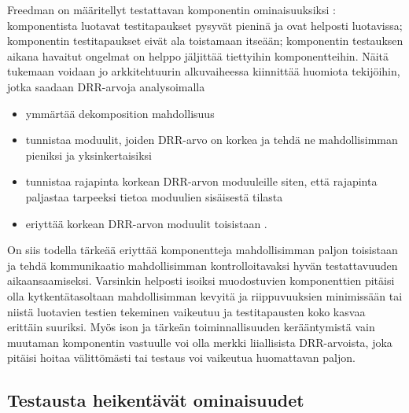 \documentclass[finnish]{tktltiki2}
\numberwithin{table}{section}
\theoremstyle{definition}
\theoremstyle{remark}
\begin{document}



Freedman on määritellyt testattavan komponentin ominaisuuksiksi \citep{Freedman:1991:TSC:126218.126229}: komponentista luotavat testitapaukset pysyvät pieninä ja ovat helposti luotavissa; komponentin testitapaukset eivät ala toistamaan itseään; komponentin testauksen aikana havaitut ongelmat on helppo jäljittää tiettyihin komponentteihin. Näitä tukemaan voidaan jo arkkitehtuurin alkuvaiheessa kiinnittää huomiota tekijöihin, jotka saadaan DRR-arvoja analysoimalla \citep{voas_improving_1992} 

\begin{itemize}
	\item ymmärtää dekomposition mahdollisuus
	\item tunnistaa moduulit, joiden DRR-arvo on korkea ja tehdä ne mahdollisimman pieniksi ja yksinkertaisiksi
	\item tunnistaa rajapinta korkean DRR-arvon moduuleille siten, että rajapinta paljastaa tarpeeksi tietoa moduulien sisäisestä tilasta
	\item eriyttää korkean DRR-arvon moduulit toisistaan \citep[s. 23]{Voas:1995:STN:624607.625469}.
\end{itemize}


On siis todella tärkeää eriyttää komponentteja mahdollisimman paljon toisistaan ja tehdä kommunikaatio mahdollisimman kontrolloitavaksi hyvän testattavuuden aikaansaamiseksi. Varsinkin helposti isoiksi muodostuvien komponenttien pitäisi olla kytkentätasoltaan mahdollisimman kevyitä ja riippuvuuksien minimissään tai niistä luotavien testien tekeminen vaikeutuu ja testitapausten koko kasvaa erittäin suuriksi. Myös ison ja tärkeän toiminnallisuuden kerääntymistä vain muutaman komponentin vastuulle voi olla merkki liiallisista DRR-arvoista, joka pitäisi hoitaa välittömästi tai testaus voi vaikeutua huomattavan paljon.



\subsection{Testausta heikentävät ominaisuudet}
\end{document}
